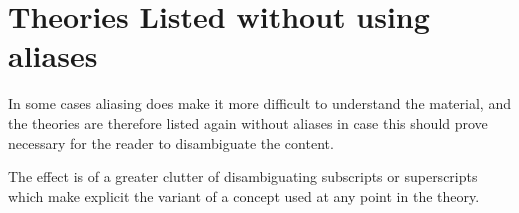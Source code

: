 {
\let\Section\subsection
\let\Subsection\subsubsection
\def\subsection#1{\Subsection*{#1}}

\pagebreak
\def\section#1{\Section{#1}\label{t045}}

\pagebreak
\def\section#1{\Section{#1}\label{t045q}}

\pagebreak
\def\section#1{\Section{#1}\label{t045k}}

\pagebreak
\def\section#1{\Section{#1}\label{t045w}}

}  %

\pagebreak
\section{Theories Listed without using aliases}\label{TheoryListingsWithoutAliases}

In some cases aliasing does make it more difficult to understand the material, and the theories are therefore listed again without aliases in case this should prove necessary for the reader to disambiguate the content.

The effect is of a greater clutter of disambiguating subscripts or superscripts which make explicit the variant of a concept used at any point in the theory.

